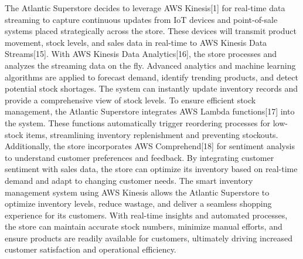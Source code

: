 The Atlantic Superstore decides to leverage AWS Kinesis[1] for real-time data streaming to capture continuous updates from IoT devices and point-of-sale systems placed strategically across the store. These devices will transmit product movement, stock levels, and sales data in real-time to AWS Kinesis Data Streams[15]. With AWS Kinesis Data Analytics[16], the store processes and analyzes the streaming data on the fly. Advanced analytics and machine learning algorithms are applied to forecast demand, identify trending products, and detect potential stock shortages. The system can instantly update inventory records and provide a comprehensive view of stock levels. To ensure efficient stock management, the Atlantic Superstore integrates AWS Lambda functions[17] into the system. These functions automatically trigger reordering processes for low-stock items, streamlining inventory replenishment and preventing stockouts. Additionally, the store incorporates AWS Comprehend[18] for sentiment analysis to understand customer preferences and feedback. By integrating customer sentiment with sales data, the store can optimize its inventory based on real-time demand and adapt to changing customer needs. The smart inventory management system using AWS Kinesis allows the Atlantic Superstore to optimize inventory levels, reduce wastage, and deliver a seamless shopping experience for its customers. With real-time insights and automated processes, the store can maintain accurate stock numbers, minimize manual efforts, and ensure products are readily available for customers, ultimately driving increased customer satisfaction and operational efficiency.

